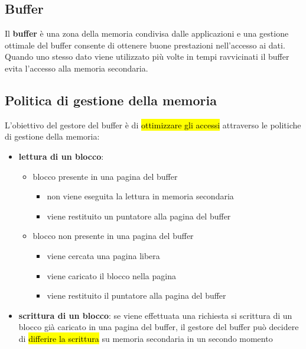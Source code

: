 \subsection{Buffer}
Il \textcolor{azzurrino}{\textbf{buffer}} è una zona della memoria condivisa dalle applicazioni e una gestione ottimale del buffer consente di ottenere buone prestazioni nell'accesso ai dati.\\[0.2ex]
Quando uno stesso dato viene utilizzato più volte in tempi ravvicinati il buffer evita
l'accesso alla memoria secondaria.


\subsection{Politica di gestione della memoria}
L'obiettivo del gestore del buffer è di \hl{ottimizzare gli accessi} attraverso le politiche di gestione della memoria:
\begin{itemize}[label=$\diamond$, itemsep=\bigskipamount]
  \item \textbf{lettura di un blocco}:
  \begin{itemize}[label=$\triangleright$, itemsep=\medskipamount]
    \item blocco presente in una pagina del buffer
    \begin{itemize}[label=$\Rightarrow$, itemsep=\smallskipamount]
      \item non viene eseguita la lettura in memoria secondaria
      \item viene restituito un puntatore alla pagina del buffer
    \end{itemize}
    \item blocco non presente in una pagina del buffer
    \begin{itemize}[label=$\Rightarrow$, itemsep=\smallskipamount]
      \item viene cercata una pagina libera
      \item viene caricato il blocco nella pagina
      \item viene restituito il puntatore alla pagina del buffer
    \end{itemize}
  \end{itemize}
  \item \textbf{scrittura di un blocco}: se viene effettuata una richiesta si scrittura di un blocco già caricato in una pagina del buffer, il gestore del buffer può decidere di \hl{differire la scrittura} su memoria secondaria in un secondo momento
\end{itemize}

